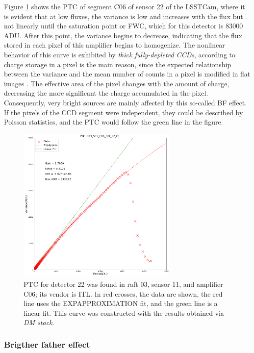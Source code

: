 Figure \ref{fig:PTC} shows the PTC of segment C06 of sensor 22 of the LSSTCam, where it is evident that at low fluxes, the variance is low and increases with the flux but not linearly until the saturation point or FWC, which for this detector is $83000$ ADU. After this point, the variance begins to decrease, indicating that the flux stored in each pixel of this amplifier begins to homogenize. The nonlinear behavior of this curve is exhibited by \textit{thick fully-depleted CCDs}, according to \cite{downing2006ccd} charge storage in a pixel is the main reason, since the expected relationship between the variance and the mean number of counts in a pixel is modified in flat images \citep{walter2015brighter}. The effective area of the pixel changes with the amount of charge, decreasing the more significant the charge accumulated in the pixel. Consequently, very bright sources are mainly affected by this so-called BF effect. If the pixels of the CCD segment were independent, they could be described by Poisson statistics, and the PTC would follow the green line in the figure.

\begin{figure}[!htb]
    \centering
    \includegraphics[width=0.7\textwidth]{Figures/PTC_R03_S11_C06_Det22.png}
    \caption{PTC for detector 22 was found in raft 03, sensor 11, and amplifier C06; its vendor is ITL. In red crosses, the data are shown, the red line uses the EXPAPPROXIMATION fit, and the green line is a linear fit. This curve was constructed with the results obtained via \textit{DM stack}.}
    \label{fig:PTC}
\end{figure}

\subsubsection{Brigther father effect}

